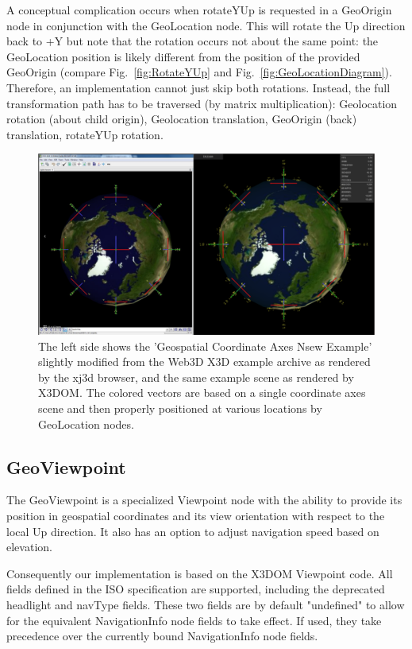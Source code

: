 \documentclass{acmsiggraph}                     %
\begin{document}
A conceptual complication occurs when rotateYUp is requested in a GeoOrigin node in conjunction with
the GeoLocation node. This will rotate the Up direction back to +Y but note that the rotation occurs
not about the same point: the GeoLocation position is likely different from the position of the
provided GeoOrigin (compare Fig.~\ref{fig:RotateYUp} and Fig.~\ref{fig:GeoLocationDiagram}).
Therefore, an implementation cannot just skip both rotations. Instead, the full transformation path
has to be traversed (by matrix multiplication): Geolocation rotation (about child origin),
Geolocation translation, GeoOrigin (back) translation, rotateYUp rotation.

\begin{figure}[htbp] \centering \includegraphics[width=6.6in]{Axes_NSEW.png} \caption{The left side
  shows the 'Geospatial Coordinate Axes Nsew Example' slightly modified from the Web3D X3D example
archive as rendered by the xj3d browser, and the same example scene as rendered by X3DOM. The
colored vectors are based on a single coordinate axes scene and then properly positioned at various
locations by GeoLocation nodes.} \label{fig:Axes_NSEW.png} \end{figure}

\subsection{GeoViewpoint}

The GeoViewpoint is a specialized Viewpoint node with the ability to provide its position in
geospatial coordinates and its view orientation with respect to the local Up direction. It also has
an option to adjust navigation speed based on elevation.

Consequently our implementation is based on the X3DOM Viewpoint code. All fields defined in the ISO
specification are supported, including the deprecated headlight and navType fields. These two fields
are by default "undefined" to allow for the equivalent NavigationInfo node fields to take effect. If
used, they take precedence over the currently bound NavigationInfo node fields.
\end{document}
